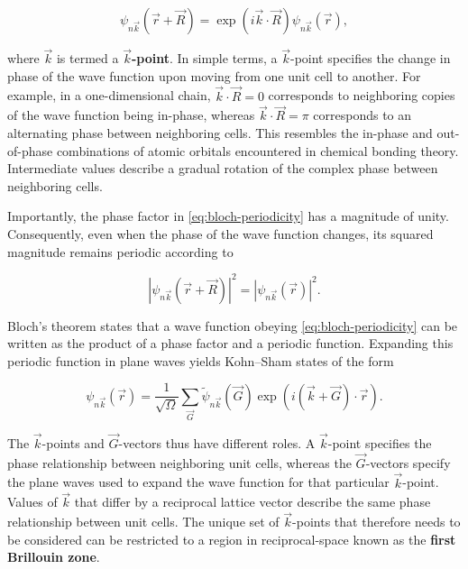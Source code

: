 \begin{equation}
    \psi_{n\vec{k}}(\vec{r}+\vec{R}) = \exp\left(i\vec{k}\cdot\vec{R}\right)\psi_{n\vec{k}}(\vec{r}),
    \label{eq:bloch-periodicity}
\end{equation}

where $\vec{k}$ is termed a \textbf{$\vec{k}$-point}. In simple terms, a $\vec{k}$-point specifies the change in phase of the wave function upon moving from one unit cell to another. For example, in a one-dimensional chain, $\vec{k}\cdot\vec{R}=0$ corresponds to neighboring copies of the wave function being in-phase, whereas $\vec{k}\cdot\vec{R}=\pi$ corresponds to an alternating phase between neighboring cells. This resembles the in-phase and out-of-phase combinations of atomic orbitals encountered in chemical bonding theory. Intermediate values describe a gradual rotation of the complex phase between neighboring cells.

Importantly, the phase factor in \cref{eq:bloch-periodicity} has a magnitude of unity. Consequently, even when the phase of the wave function changes, its squared magnitude remains periodic according to

\begin{equation}
    \left|\psi_{n\vec{k}}(\vec{r}+\vec{R})\right|^{2} = \left|\psi_{n\vec{k}}(\vec{r})\right|^{2}.
\end{equation}

Bloch's theorem states that a wave function obeying \cref{eq:bloch-periodicity} can be written as the product of a phase factor and a periodic function. Expanding this periodic function in plane waves yields Kohn--Sham states of the form

\begin{equation}
    \psi_{n\vec{k}}(\vec{r}) = \frac{1}{\sqrt{\Omega}} \sum_{\vec{G}} \tilde{\psi}_{n\vec{k}}(\vec{G}) \exp\left(i(\vec{k}+\vec{G})\cdot\vec{r}\right).
    \label{eq:bloch-pw-exp}
\end{equation}

The $\vec{k}$-points and $\vec{G}$-vectors thus have different roles. A $\vec{k}$-point specifies the phase relationship between neighboring unit cells, whereas the $\vec{G}$-vectors specify the plane waves used to expand the wave function for that particular $\vec{k}$-point. Values of $\vec{k}$ that differ by a reciprocal lattice vector describe the same phase relationship between unit cells. The unique set of $\vec{k}$-points that therefore needs to be considered can be restricted to a region in reciprocal-space known as the \textbf{first Brillouin zone}.

